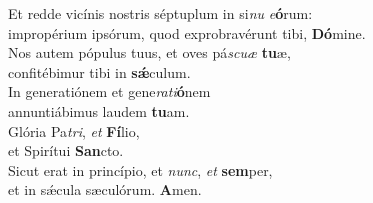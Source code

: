 \oddverse Et redde vicínis nostris séptuplum in si\textit{nu} \textit{e}\textbf{ó}rum:~\*\\
\oddverse impropérium ipsórum, quod exprobravérunt tibi, \textbf{Dó}mine.\\
\evenverse Nos autem pópulus tuus, et oves pá\textit{scu}\textit{æ} \textbf{tu}æ,~\*\\
\evenverse confitébimur tibi in \textbf{sǽ}culum.\\
\oddverse In generatiónem et gene\textit{ra}\textit{ti}\textbf{ó}nem~\*\\
\oddverse annuntiábimus laudem \textbf{tu}am.\\
\evenverse Glória Pa\textit{tri}, \textit{et} \textbf{Fí}lio,~\*\\
\evenverse et Spirítui \textbf{San}cto.\\
\oddverse Sicut erat in princípio, et \textit{nunc}, \textit{et} \textbf{sem}per,~\*\\
\oddverse et in sǽcula sæculórum. \textbf{A}men.\\
